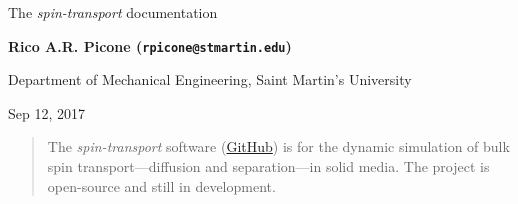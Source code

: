 \documentclass[%
oneside,                 %
final,                   %
10pt]{article}
\begin{document}

\newcommand{\exercisesection}[1]{\subsection*{#1}}







\thispagestyle{empty}

\begin{center}
{\LARGE\bf
\begin{spacing}{1.25}
The \emph{spin-transport} documentation
\end{spacing}
}
\end{center}


\begin{center}
{\bf Rico A.R. Picone (\texttt{rpicone@stmartin.edu})}
\end{center}

    \begin{center}
\centerline{{\small Department of Mechanical Engineering, Saint Martin's University}}
\end{center}
    

\begin{center}
Sep 12, 2017
\end{center}

\vspace{1cm}

\begin{abstract}
The \emph{spin-transport} software (\href{{https://github.com/ricopicone/spin-transport}}{GitHub}) is for the dynamic simulation of bulk spin transport---diffusion and separation---in solid media.
The project is open-source and still in development.
\end{abstract}

\tableofcontents


\vspace{1cm} %
\end{document}
